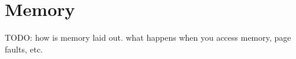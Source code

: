 \chapter{Memory}

TODO: how is memory laid out. what happens when you access
memory, page faults, etc.
